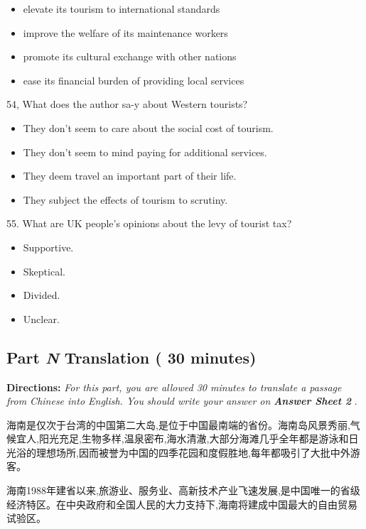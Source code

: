 \documentclass[UTF8,11pt]{ctexart}
\begin{document}
\begin{itemize}[leftmargin=2em,itemsep=.2em,topsep=.4em]\item[A.] elevate its tourism to international standards
\item[B.] improve the welfare of its maintenance workers
\item[C.] promote its cultural exchange with other nations
\item[D.] ease its financial burden of providing local services
\end{itemize}

54, What does the author sa-y about Western tourists?


\begin{itemize}[leftmargin=2em,itemsep=.2em,topsep=.4em]\item[A.] They don't seem to care about the social cost of tourism.
\item[B.] They don't seem to mind paying for additional services.
\item[C.] They deem travel an important part of their life.
\item[D.] They subject the effects of tourism to scrutiny.
\end{itemize}

55. What are UK people's opinions about the levy of tourist tax?


\begin{itemize}[leftmargin=2em,itemsep=.2em,topsep=.4em]\item[A.] Supportive.
\item[B.] Skeptical.
\item[C.] Divided.
\item[D.] Unclear.
\end{itemize}

\subsection*{\textbf{Part }\textbf{\textit{N}} \textbf{Translation} \textbf{( 30 minutes)}}


\textbf{Directions: }\textit{For this part, you are allowed 30 minutes to translate a passage from Chinese into English. You} \textit{should write your answer on }\textbf{\textit{Answer Sheet 2 }}.


海南是仅次于台湾的中国第二大岛,是位于中国最南端的省份。海南岛风景秀丽,气候宜人,阳光充足,生物多样,温泉密布,海水清澈,大部分海滩几乎全年都是游泳和日光浴的理想场所,因而被誉为中国的四季花园和度假胜地,每年都吸引了大批中外游客。


海南1988年建省以来,旅游业、服务业、高新技术产业飞速发展,是中国唯一的省级经济特区。在中央政府和全国人民的大力支持下,海南将建成中国最大的自由贸易试验区。
\end{document}
